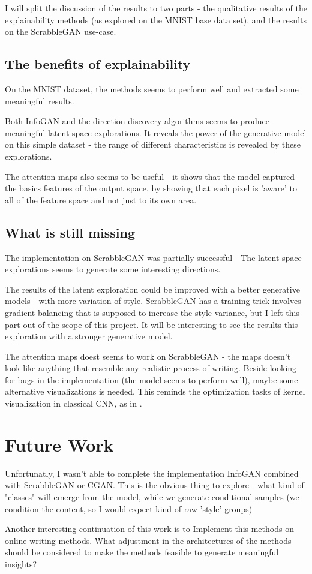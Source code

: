 I will split the discussion of the results to two parts - the qualitative results of the explainability methods (as explored on the MNIST base data set), and the results on the ScrabbleGAN use-case.


\subsection{The benefits of explainability}
On the MNIST dataset, the methods seems to perform well and extracted some meaningful results.

Both InfoGAN and the direction discovery algorithms seems to produce meaningful latent space explorations. It reveals the power of the generative model on this simple dataset - the range of different characteristics is revealed by these explorations. 

The attention maps also seems to be useful - it shows that the model captured the basics features of the output space, by showing that each pixel is 'aware' to all of the feature space and not just to its own area. 


\subsection{What is still missing}
The implementation on ScrabbleGAN was partially successful - The latent space explorations seems to generate some interesting directions.

The results of the latent exploration could be improved with a better generative models - with more variation of style. ScrabbleGAN has a training trick involves gradient balancing that is supposed to increase the style variance, but I left this part out of the scope of this project.
It will be interesting to see the results this exploration with a stronger generative model.


The attention maps doest seems to work on ScrabbleGAN - the maps doesn't look like anything that resemble any realistic process of writing. 
Beside looking for bugs in the implementation (the model seems to perform well), maybe some alternative visualizations is needed. This reminds the optimization tasks of kernel visualization in classical CNN, as in \cite{15}. 




\section{Future Work}
Unfortunatly, I wasn't able to complete the implementation InfoGAN combined with ScrabbleGAN or CGAN. This is the obvious thing to explore - what kind of "classes" will emerge from the model, while we generate conditional samples (we condition the content, so I would expect kind of raw 'style' groups)

Another interesting continuation of this work is to Implement this methods on online writing methods. What adjustment in the architectures of the methods should be considered to make the methods feasible to generate meaningful insights?
